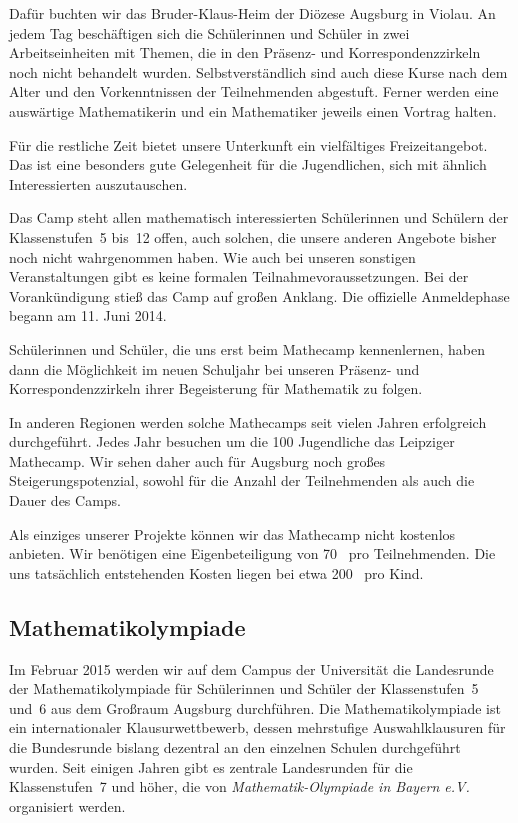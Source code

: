 \documentclass[12pt]{zettel}
\begin{document}
Dafür buchten wir das Bruder-Klaus-Heim der Diözese Augsburg in Violau. An jedem Tag beschäftigen sich die Schülerinnen und Schüler in zwei
Arbeitseinheiten mit Themen, die in den Präsenz- und Korrespondenzzirkeln noch
nicht behandelt wurden. Selbstverständlich sind auch diese Kurse nach dem Alter
und den Vorkenntnissen der Teilnehmenden abgestuft. Ferner
werden eine auswärtige Mathematikerin und ein Mathematiker jeweils einen
Vortrag halten.

Für die restliche Zeit bietet unsere Unterkunft ein vielfältiges
Freizeitangebot. Das ist eine besonders gute Gelegenheit für die Jugendlichen,
sich mit ähnlich Interessierten auszutauschen.

Das Camp steht allen mathematisch interessierten Schülerinnen und Schülern der
Klassenstufen~5 bis~12 offen, auch solchen, die unsere anderen Angebote bisher
noch nicht wahrgenommen haben. Wie auch bei unseren sonstigen Veranstaltungen gibt es keine formalen Teilnahmevoraussetzungen. Bei der Vorankündigung stieß das Camp auf großen
Anklang. Die offizielle Anmeldephase begann am 11. Juni 2014.

Schülerinnen und Schüler, die uns erst beim Mathecamp kennenlernen, haben dann die Möglichkeit im neuen Schuljahr bei unseren Präsenz- und Korrespondenzzirkeln ihrer Begeisterung für Mathematik zu folgen.

In anderen Regionen werden solche Mathecamps seit vielen Jahren erfolgreich durchgeführt. Jedes Jahr besuchen um die 100 Jugendliche das Leipziger Mathecamp. Wir sehen daher auch für Augsburg noch großes Steigerungspotenzial, sowohl für die Anzahl der Teilnehmenden als auch die Dauer des Camps.

Als einziges unserer Projekte können wir das Mathecamp nicht kostenlos
anbieten. Wir benötigen eine Eigenbeteiligung von 70~\texteuro{} pro
Teilnehmenden. Die uns tatsächlich entstehenden Kosten liegen bei etwa
200~\texteuro{} pro Kind.

\subsection{Mathematikolympiade}

Im Februar 2015 werden wir auf dem Campus der Universität die Landesrunde der Mathematikolympiade für Schülerinnen und Schüler der Klassenstufen~5 und~6 aus dem Großraum
Augsburg durchführen. Die Mathematikolympiade ist ein internationaler Klausurwettbewerb, dessen mehrstufige Auswahlklausuren für die Bundesrunde
bislang dezentral an den einzelnen Schulen durchgeführt wurden. Seit einigen
Jahren gibt es zentrale Landesrunden für die Klassenstufen~7 und höher, die von
\emph{Mathematik-Olympiade in Bayern e.V.} organisiert werden.
\end{document}
